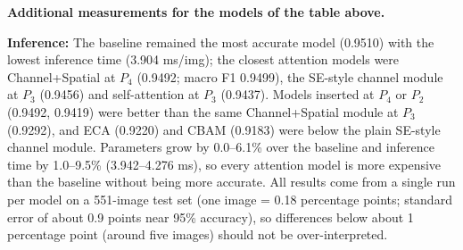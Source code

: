 \documentclass[10pt]{article}
\begin{document}
\textbf{Additional measurements for the models of the table above.}

\begin{center}
\end{center}

\textbf{Inference:} The baseline remained the most accurate model (0.9510) with the lowest inference time (3.904 ms/img); the closest attention models were Channel+Spatial at $P_4$ (0.9492; macro F1 0.9499), the SE-style
channel module at $P_3$ (0.9456) and self-attention at $P_3$ (0.9437). Models inserted at $P_4$ or $P_2$ (0.9492, 0.9419) were better than the same Channel+Spatial module at $P_3$ (0.9292), and
ECA (0.9220) and CBAM (0.9183) were below the plain SE-style channel module. Parameters grow by 0.0--6.1\% over the baseline and inference time by 1.0--9.5\% (3.942--4.276 ms), so every attention model is more expensive than the baseline
without being more accurate. All results come from a single run per model on a 551-image test set (one image = 0.18 percentage points; standard error of about 0.9 points near 95\% accuracy),
so differences below about 1 percentage point (around five images) should not be over-interpreted.
\end{document}
